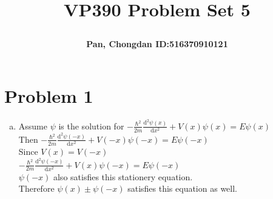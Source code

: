 \documentclass[a4paper]{article}
\title{\Large \textbf{VP390 Problem Set 5}\\
\author{\textbf{Pan, Chongdan ID:516370910121}\\
}
}
\begin{document}
\maketitle
\section{Problem 1}
\begin{enumerate}[(b)]
    \item Assume $\psi$ is the solution for $-\frac{\hbar^2}{2m}\frac{\mathrm{d}^2\psi(x)}{\mathrm{d}x^2}+V(x)\psi(x)=E\psi(x)$
    \\Then $-\frac{\hbar^2}{2m}\frac{\mathrm{d}^2\psi(-x)}{\mathrm{d}x^2}+V(-x)\psi(-x)=E\psi(-x)$
    \\Since $V(x)=V(-x)$
    \\$-\frac{\hbar^2}{2m}\frac{\mathrm{d}^2\psi(-x)}{\mathrm{d}x^2}+V(x)\psi(-x)=E\psi(-x)$
    \\$\psi(-x)$ also satisfies this stationery equation.
    \\Therefore $\psi(x)\pm\psi(-x)$ satisfies this equation as well. 
\end{enumerate}
\end{document}
